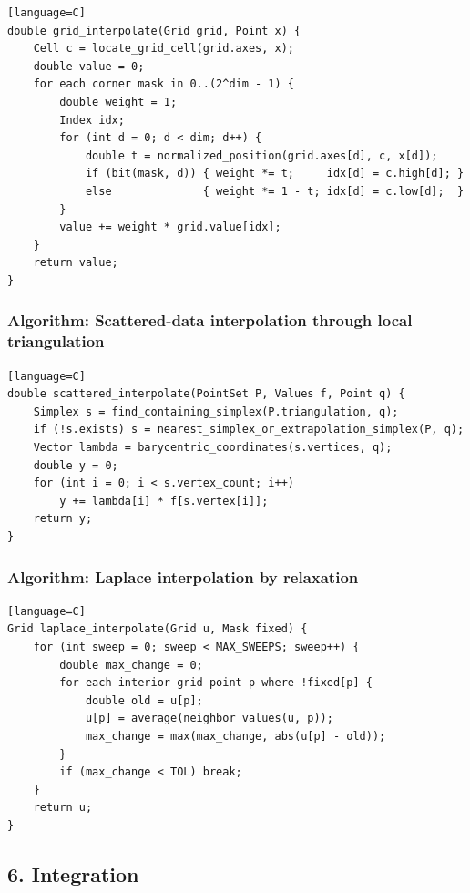 \documentclass[11pt]{article}
\begin{document}
\begin{verbatim}[language=C]
double grid_interpolate(Grid grid, Point x) {
    Cell c = locate_grid_cell(grid.axes, x);
    double value = 0;
    for each corner mask in 0..(2^dim - 1) {
        double weight = 1;
        Index idx;
        for (int d = 0; d < dim; d++) {
            double t = normalized_position(grid.axes[d], c, x[d]);
            if (bit(mask, d)) { weight *= t;     idx[d] = c.high[d]; }
            else              { weight *= 1 - t; idx[d] = c.low[d];  }
        }
        value += weight * grid.value[idx];
    }
    return value;
}
\end{verbatim}

\subsubsection{Algorithm: Scattered-data interpolation through local triangulation}\label{algorithm-scattered-data-interpolation-through-local-triangulation}

\begin{verbatim}[language=C]
double scattered_interpolate(PointSet P, Values f, Point q) {
    Simplex s = find_containing_simplex(P.triangulation, q);
    if (!s.exists) s = nearest_simplex_or_extrapolation_simplex(P, q);
    Vector lambda = barycentric_coordinates(s.vertices, q);
    double y = 0;
    for (int i = 0; i < s.vertex_count; i++)
        y += lambda[i] * f[s.vertex[i]];
    return y;
}
\end{verbatim}

\subsubsection{Algorithm: Laplace interpolation by relaxation}\label{algorithm-laplace-interpolation-by-relaxation}

\begin{verbatim}[language=C]
Grid laplace_interpolate(Grid u, Mask fixed) {
    for (int sweep = 0; sweep < MAX_SWEEPS; sweep++) {
        double max_change = 0;
        for each interior grid point p where !fixed[p] {
            double old = u[p];
            u[p] = average(neighbor_values(u, p));
            max_change = max(max_change, abs(u[p] - old));
        }
        if (max_change < TOL) break;
    }
    return u;
}
\end{verbatim}

\subsection{6. Integration}\label{integration}
\end{document}
